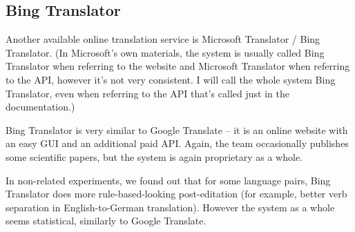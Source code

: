 \begin{comment}
We figured out it's not too expensive for our testing purposes, so we ended up paying for the API.\footnote{The cost is measured per character on the source side. We used about 3 million characters and paid about 60 dollars. This is rather high for any repeated experiments, but not that high for one-time translation.}

To automate Google Translate, we cannot use the website itself, simply because pasting tens of thousands of lines into a browser window usually crashes the browser and is probably against Google Translate's Terms of Use.

There are some workarounds around this, such as \uv{faking} browser environment using some automation tools and/or libraries, but we used more stable option.


We used a Java library for Google Translate API, called prosaically \uv{google-api-translate-java} (\url{http://code.google.com/p/google-api-translate-java}).

The tests were done on 3rd May, 2014.\footnote{I think it's important to note the date of the tests, because the quality of online services might change overtime.}
\end{comment}

\subsection{Bing Translator}
\label{bing}
Another available online translation service is Microsoft Translator / Bing Translator. (In Microsoft's own materials, the system is usually called Bing Translator when referring to the website and Microsoft Translator when referring to the API, however it's not very consistent. I will call the whole system Bing Translator, even when referring to the API that's called just  in the documentation.)

Bing Translator is very similar to Google Translate -- it is an online website with an easy GUI and an additional paid API. Again, the team occasionally publishes some scientific papers, but the system is again  proprietary as a whole.

In non-related experiments, we found out that for some language pairs, Bing Translator does more rule-based-looking post-editation (for example, better verb separation in English-to-German translation). 
However the system as a whole seems statistical, similarly to Google Translate.


